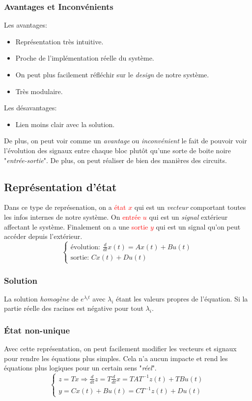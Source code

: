 \documentclass{report}
\begin{document}
\subsubsection{Avantages et Inconvénients}
Les avantages:
\begin{itemize}
	\item Représentation très intuitive.
	\item Proche de l'implémentation réelle du système.
	\item On peut plus facilement réfléchir sur le \textit{design} de notre système.
	\item Très modulaire.
\end{itemize}
Les désavantages:
\begin{itemize}
	\item Lien moins clair avec la solution.
\end{itemize}
De plus, on peut voir comme un \textit{avantage} ou \textit{inconvénient} le fait de pouvoir voir l'évolution des signaux entre chaque bloc plutôt qu'une sorte de boite noire "\textit{entrée-sortie}". De plus, on peut réaliser de bien des manières des circuits.

\subsection{Représentation d'état}
Dans ce type de représenation, on a \textcolor{red}{état $x$} qui est un \textit{vecteur} comportant toutes les infos internes de notre système. On \textcolor{red}{entrée $u$} qui est un \textit{signal} extérieur affectant le système. Finalement on a une \textcolor{red}{sortie $y$} qui est un signal qu'on peut accéder depuis l'extérieur.\\
\begin{equation}
\begin{cases}
\text{évolution: }\frac{d}{dt}x(t) =  Ax(t) + Bu(t)\\
\text{sortie: } C x(t) + D u(t)
\end{cases}
\end{equation}

\subsubsection{Solution}
La solution \textit{homogène} de $e^{\lambda_it}$ avec $\lambda_i$ étant les valeurs propres de l'équation. Si la partie réelle des racines est négative pour tout $\lambda_i$.

\subsubsection{État non-unique}
Avec cette représentation, on peut facilement modifier les vecteurs et signaux pour rendre les équations plus simples. Cela n'a aucun impacte et rend les équations plus logiques pour un certain sens "\textit{réel}".
\begin{equation}
\begin{cases}
z = Tx \Rightarrow \frac{d}{dt}z = T\frac{d}{dt}x = TAT^{-1}z(t) + TBu(t)\\
y = Cx(t) + Bu(t) = CT^{-1}z(t) + Du(t) 
\end{cases}
\end{equation}
\end{document}
